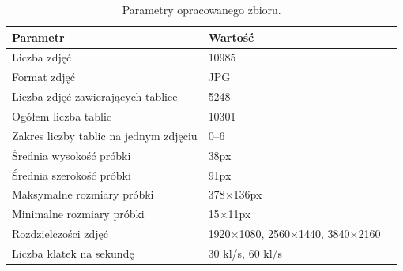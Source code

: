 \begin{table}[h]
    \centering
    \caption{Parametry opracowanego zbioru.}
    \begin{tabular}{l l l}
        \toprule
        \textbf{Parametr}                      & \textbf{Wartość}                                     \\
        \midrule
        Liczba zdjęć                           & 10985                                                \\
        Format zdjęć                           & JPG                                                  \\
        Liczba zdjęć zawierających tablice     & 5248                                                 \\
        Ogółem liczba tablic                   & 10301                                                \\
        Zakres liczby tablic na jednym zdjęciu & 0--6                                                 \\
        Średnia wysokość próbki                & 38px                                                 \\
        Średnia szerokość próbki               & 91px                                                 \\
        Maksymalne rozmiary próbki             & 378$\times$136px                                     \\
        Minimalne rozmiary próbki              & 15$\times$11px                                       \\
        Rozdzielczości zdjęć                   & 1920$\times$1080, 2560$\times$1440, 3840$\times$2160 \\
        Liczba klatek na sekundę               & 30 kl/s, 60 kl/s                                     \\
        \bottomrule
    \end{tabular}
    \label{tab:tab_data_set_characteristics}
\end{table}